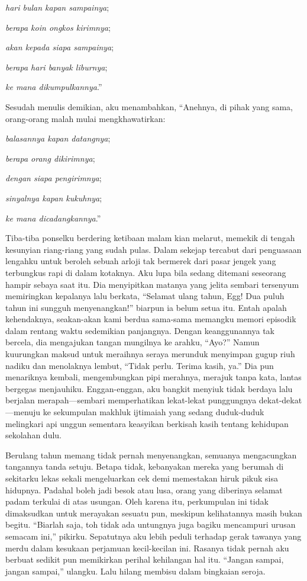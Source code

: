\documentclass[smalldemyvopaper,11pt,twoside,onecolumn,openright,extrafontsizes]{memoir}
\begin{document}
\textit{hari bulan kapan sampainya};

\textit{berapa koin ongkos kirimnya};

\textit{akan kepada siapa sampainya};

\textit{berapa hari banyak liburnya};

\textit{ke mana dikumpulkannya}.''

Sesudah menulis demikian, aku menambahkan, ``Anehnya, di pihak yang sama, orang-orang malah mulai mengkhawatirkan:

\textit{balasannya kapan datangnya};

\textit{berapa orang dikirimnya};

\textit{dengan siapa pengirimnya};

\textit{sinyalnya kapan kukuhnya};

\textit{ke mana dicadangkannya}.''

Tiba-tiba ponselku berdering ketibaan malam kian melarut, memekik di tengah kesunyian riang-riang yang sudah pulas. Dalam sekejap tercabut dari penguasaan lengahku untuk beroleh sebuah arloji tak bermerek dari pasar jengek yang terbungkus rapi di dalam kotaknya. Aku lupa bila sedang ditemani seseorang hampir sebaya saat itu. Dia menyipitkan matanya yang jelita sembari tersenyum memiringkan kepalanya lalu berkata, ``Selamat ulang tahun, Egg! Dua puluh tahun ini sungguh menyenangkan!'' biarpun ia belum setua itu. Entah apalah kehendaknya, seakan-akan kami berdua sama-sama memangku memori episodik dalam rentang waktu sedemikian panjangnya. Dengan keanggunannya tak bercela, dia mengajukan tangan mungilnya ke arahku, ``Ayo?'' Namun kuurungkan maksud untuk meraihnya seraya merunduk menyimpan gugup riuh nadiku dan menolaknya lembut, ``Tidak perlu. Terima kasih, ya.'' Dia pun menariknya kembali, mengembungkan pipi merahnya, merajuk tanpa kata, lantas bergegas menjauhiku. Enggan-enggan, aku bangkit menyiuk tidak berdaya lalu berjalan merapah---sembari memperhatikan lekat-lekat punggungnya dekat-dekat---menuju ke sekumpulan makhluk ijtimaiah yang sedang duduk-duduk melingkari api unggun sementara keasyikan berkisah kasih tentang kehidupan sekolahan dulu.

Berulang tahun memang tidak pernah menyenangkan, semuanya mengacungkan tangannya tanda setuju. Betapa tidak, kebanyakan mereka yang berumah di sekitarku lekas sekali mengeluarkan cek demi memestakan hiruk pikuk sisa hidupnya. Padahal boleh jadi besok atau lusa, orang yang diberinya selamat padam terkulai di atas usungan. Oleh karena itu, perkumpulan ini tidak dimaksudkan untuk merayakan sesuatu pun, meskipun kelihatannya masih bukan begitu. ``Biarlah saja, toh tidak ada untungnya juga bagiku mencampuri urusan semacam ini,'' pikirku. Sepatutnya aku lebih peduli terhadap gerak tawanya yang merdu dalam kesukaan perjamuan kecil-kecilan ini. Rasanya tidak pernah aku berbuat sedikit pun memikirkan perihal kehilangan hal itu. ``Jangan sampai, jangan sampai,'' ulangku. Lalu hilang membisu dalam bingkaian seroja.
\end{document}
